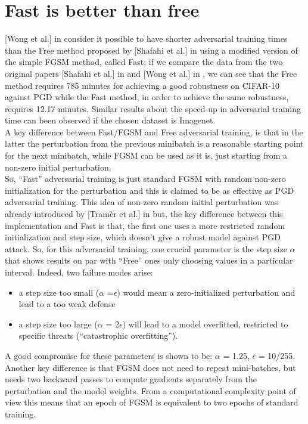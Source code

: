 \documentclass{article}
\begin{document}
\section{Fast is better than free}

[Wong et al.] in \cite{WongEtAl2020} consider it possible to have shorter
adversarial training times than the Free method proposed by [Shafahi et al.] in
\cite{ShafahiEtAl2019b} using a modified version of the simple FGSM method,
called Fast; if we compare the data from the two original papers [Shafahi et
al.] in \cite{ShafahiEtAl2019b} and [Wong et al.] in \cite{WongEtAl2020}, we can see
that the Free method requires 785 minutes for achieving a good robustness on
CIFAR-10 against PGD while the Fast method, in order to achieve the same
robustness, requires 12.17 minutes. Similar results about the speed-up in
adversarial training time can been observed if the chosen dataset is Imagenet.\\
A key difference between Fast/FGSM and Free adversarial training, is that in the
latter the perturbation from the previous minibatch is a reasonable starting
point for the next minibatch, while FGSM can be used as it is, just starting
from a non-zero initial perturbation.\\
So, “Fast” adversarial training is just standard FGSM with random non-zero
initialization for the perturbation and this is claimed to be as effective as
PGD adversarial training. This idea of non-zero random initial perturbation was
already introduced by [Tramèr et al.] in \cite{TramerEtAl2017} but, the key
difference between this implementation and Fast is that, the first one uses a
more restricted random initialization and step size, which doesn't give a robust
model against PGD attack.  So, for this adversarial training, one crucial
parameter is the step size $\alpha$ that shows results on par with “Free” ones
only choosing values in a particular interval. Indeed, two failure modes arise:
\begin{itemize}

\item a step size too small ($\alpha$ =$\epsilon$) would mean a zero-initialized
perturbation and lead to a too weak defense
\item a step size too large ($\alpha$ = $2\epsilon$) will lead to a model
overfitted, restricted to specific threats (“catastrophic overfitting”).
\end{itemize}

A good compromise for these parameters is shown to be: $\alpha$ = 1.25,
$\epsilon$ = 10/255.\\
Another key difference is that FGSM does not need to repeat mini-batches, but
needs two backward passes to compute gradients separately from the perturbation
and the model weights. From a computational complexity point of view this means
that an epoch of FGSM is equivalent to two epochs of standard training.
\end{document}
